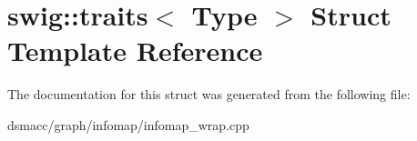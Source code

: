 \hypertarget{structswig_1_1traits}{}\section{swig\+:\+:traits$<$ Type $>$ Struct Template Reference}
\label{structswig_1_1traits}


The documentation for this struct was generated from the following file\+:\begin{DoxyCompactItemize}
\item 
dsmacc/graph/infomap/infomap\+\_\+wrap.\+cpp\end{DoxyCompactItemize}

